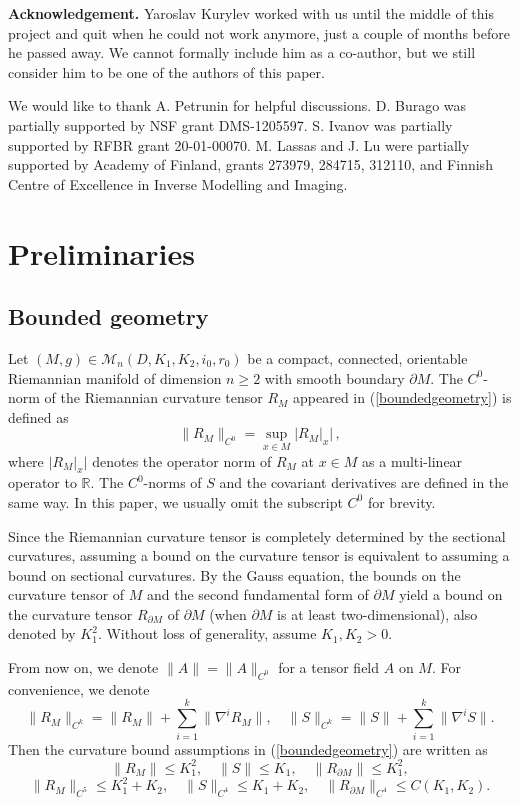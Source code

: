 \documentclass[11pt,letterpaper]{amsart}
\numberwithin{equation}{section}
\theoremstyle{definition}
\theoremstyle{plain}
\theoremstyle{definition}
\theoremstyle{plain}
\theoremstyle{definition}
\theoremstyle{plain}
\begin{document}
\smallskip
\noindent \textbf{Acknowledgement.} Yaroslav Kurylev worked with us until the middle of this project and quit when he could not work anymore, just a couple of months before he passed away. We cannot formally include him as a co-author, but we still consider him to be one of the authors of this paper.

We would like to thank A. Petrunin for helpful discussions. D. Burago was partially supported by NSF grant DMS-1205597. S. Ivanov was partially supported by RFBR grant 20-01-00070. M. Lassas and J. Lu were partially supported by Academy of Finland, grants 273979, 284715, 312110, and Finnish Centre of Excellence in Inverse Modelling and Imaging.



\section{Preliminaries}\label{pre}

\subsection{Bounded geometry} \label{subsection-bounded}

Let $(M,g)\in \mathcal{M}_n(D,K_1,K_2,i_0,r_0)$ be a compact, connected, orientable Riemannian manifold of dimension $n\geqslant 2$ with smooth boundary $\partial M$. The $C^0$-norm of the Riemannian curvature tensor $R_M$ appeared in (\ref{boundedgeometry}) is defined as
$$\|R_M\|_{C^0}=\sup_{x\in M}\big|R_M|_x \big|\, ,$$
where $\big|R_M|_x\big|$ denotes the operator norm of $R_M$ at $x\in M$ as a multi-linear operator to $\mathbb{R}$. The $C^0$-norms of $S$ and the covariant derivatives are defined in the same way. In this paper, we usually omit the subscript $C^0$ for brevity.

Since the Riemannian curvature tensor is completely determined by the sectional curvatures, assuming a bound on the curvature tensor is equivalent to assuming a bound on sectional curvatures. By the Gauss equation, the bounds on the curvature tensor of $M$ and the second fundamental form of $\partial M$ yield a bound on the curvature tensor $R_{\partial M}$ of $\partial M$ (when $\partial M$ is at least two-dimensional), also denoted by $K_1^2$. Without loss of generality, assume $K_1,K_2>0$.

From now on, we denote $\|A \|=\|A\|_{C^0}$ for a tensor field $A$ on $M$.
For convenience, we denote
$$\|R_M\|_{C^k}=\|R_M\|+\sum_{i=1}^k \|\nabla^i R_M\|,\quad \|S\|_{C^k}=\|S\|+\sum_{i=1}^k \|\nabla^i S\|.$$
Then the curvature bound assumptions in (\ref{boundedgeometry}) are written as
$$\|R_M\|\leqslant K_1^2,\quad \|S\|\leqslant K_1,\quad \|R_{\partial M}\|\leqslant K_1^2,$$
$$\|R_M\|_{C^5}\leqslant K_1^2+K_2,\quad \|S\|_{C^4}\leqslant K_1+K_2,\quad \|R_{\partial M}\|_{C^4}\leqslant C(K_1,K_2).$$
\end{document}
